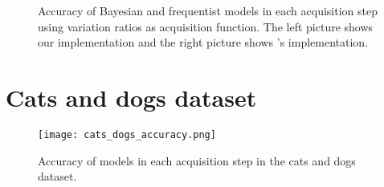 \begin{figure}[H]
  \centering
  \hfill
  \caption{Accuracy of Bayesian and frequentist models in each acquisition step using variation ratios as acquisition function. The left picture shows our implementation and the right picture shows \citeauthor{Gal2016Active}'s implementation.}
  \label{fig:mnist_var_ratios_AL}
\end{figure}


%
%

\section{Cats and dogs dataset}


\begin{figure}[H]
    \centering
    \texttt{[image: cats\_dogs\_accuracy.png]}
    \caption{Accuracy of models in each acquisition step in the cats and dogs dataset.}
    \label{fig:cats_dogs_comparison_active_learning_random}
\end{figure}


